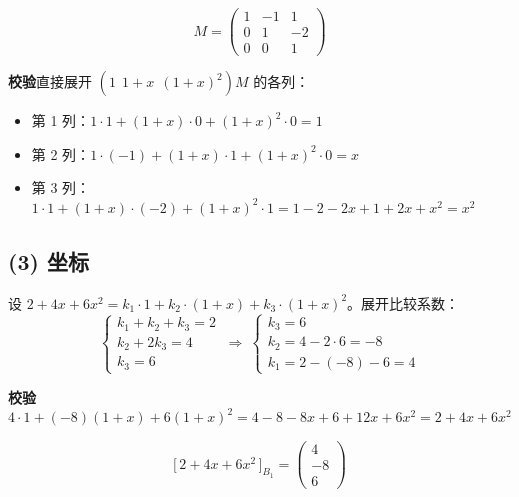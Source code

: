 \documentclass[10pt]{ctexart}
\newcommand{\bv}[1]{\begin{pmatrix}#1\end{pmatrix}}
\begin{document}
\[
\boxed{\ M=\bv{1&-1&1\\0&1&-2\\0&0&1}\ }
\]

\textbf{校验}\quad 直接展开 $(1\ \ 1+x\ \ (1+x)^2)M$ 的各列：
\begin{itemize}
\item 第 1 列：$1\cdot1+(1+x)\cdot0+(1+x)^2\cdot0=1$ \checkmark
\item 第 2 列：$1\cdot(-1)+(1+x)\cdot1+(1+x)^2\cdot0=x$ \checkmark
\item 第 3 列：$1\cdot1+(1+x)\cdot(-2)+(1+x)^2\cdot1 = 1-2-2x+1+2x+x^2=x^2$ \checkmark
\end{itemize}

\subsection*{(3) 坐标}

设 $2+4x+6x^2=k_1\cdot1+k_2\cdot(1+x)+k_3\cdot(1+x)^2$。展开比较系数：
\[
\begin{cases}
k_1+k_2+k_3=2\\
k_2+2k_3=4\\
k_3=6
\end{cases}
\ \Longrightarrow\
\begin{cases}
k_3=6\\
k_2=4-2\cdot6=-8\\
k_1=2-(-8)-6=4
\end{cases}
\]

\textbf{校验}\quad $4\cdot1+(-8)(1+x)+6(1+x)^2 = 4-8-8x+6+12x+6x^2 = 2+4x+6x^2$ \checkmark

\[
\boxed{\ \big[\,2+4x+6x^2\,\big]_{B_1}=\bv{4\\-8\\6}\ }
\]
\end{document}
